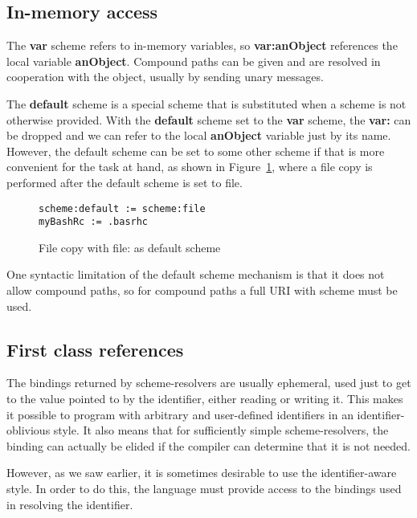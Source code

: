 \documentclass[preprint,authoryear]{acm_proc_article-sp}
\begin{document}
\subsection{In-memory access}

The {\bf var} scheme refers to in-memory variables, so {\bf var:anObject} references the
local variable {\bf anObject}.   Compound paths can be given and are resolved in
cooperation with the object, usually by sending unary messages.

The {\bf default} scheme 
is a special scheme that is substituted when a scheme is not otherwise provided.
With the {\bf default} scheme set to the {\bf var} scheme, the {\bf var:} can be 
dropped and we can refer to the local {\bf anObject} variable just by its name.
However, the default scheme can be set to some other scheme if that is more
convenient for the task at hand, as shown in Figure~\ref{file-as-default-scheme},
where a file copy is performed after the default scheme is set to file.

\begin{figure}[htbp]
\begin{center}
\begin{verbatim}
scheme:default := scheme:file
myBashRc := .basrhc
\end{verbatim}
\caption{File copy with file: as default scheme}
\label{file-as-default-scheme}
\end{center}
\end{figure}

One syntactic limitation of the default scheme mechanism is that it does not allow
compound paths, so for compound paths a full URI with scheme must be used.



\subsection{First class references}

The bindings returned by scheme-resolvers are usually ephemeral, used just 
to get to the value pointed to by the identifier, either reading or writing it.  This
makes it possible to program with arbitrary and user-defined identifiers in
an identifier-oblivious style.  It also means that for sufficiently simple scheme-resolvers,
the binding can actually be elided if the compiler can determine that it is not needed.

However, as we saw earlier, it is sometimes
desirable to use the identifier-aware style.  In order to do this, the language
must provide access to the bindings used in resolving the identifier.
\end{document}
